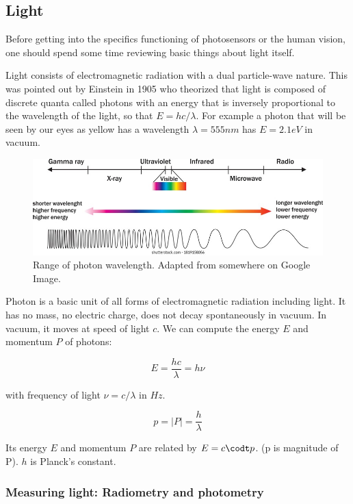 \subsection{Light}

Before getting into the specifics functioning of photosensors or the human vision, one should spend some time reviewing basic things about light itself. 

Light consists of electromagnetic radiation with a dual particle-wave nature. This was pointed out by Einstein in 1905 who theorized that light is composed of discrete quanta called photons with an energy that is inversely proportional to the wavelength of the light, so that $E=hc/\lambda$.
For example a photon that will be seen by our eyes as yellow has a wavelength $λ=555nm$ has $E=2.1eV$ in vacuum.

\begin{figure}[H]
    \centering
    \includegraphics[width=0.7\linewidth]{../../Figures/Light.jpg}
    \caption{Range of photon wavelength. Adapted from somewhere on Google Image.}
    \label{fig:Light}
\end{figure}


Photon is a basic unit of all forms of electromagnetic radiation including light. It has no mass, no electric charge, does not decay spontaneously in vacuum. In vacuum, it moves at speed of light $c$. We can compute the energy $E$ and momentum $P$ of photons: 

\begin{equation}
    E = \frac{h c}{\lambda} = h \nu 
\end{equation}

with frequency of light $\nu = c/\lambda$ in $Hz$.

\begin{equation}
    p = |P| = \frac{h}{\lambda}
\end{equation}

Its energy $E$ and momentum $P$ are related by $E=c\codt p$. (p is magnitude of P). $h$ is Planck's constant. 

\subsubsection{Measuring light: Radiometry and photometry}

